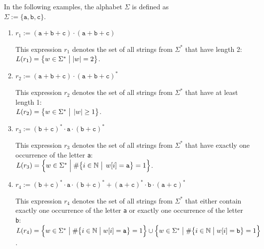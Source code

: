 \examplesEng
In the following examples, the alphabet $ \Sigma $ is defined as
\\[0.2cm]
\hspace*{1.3cm}
$\Sigma := \{ \texttt{a}, \texttt{b}, \texttt{c} \}$.
\begin{enumerate}
\item $ r_1 := (\texttt{a} + \texttt{b} + \texttt{c}) \cdot (\texttt{a} + \texttt{b} + \texttt{c}) $

      This expression $ r_1 $ denotes the set of all strings from $\Sigma^*$ that have length 2:
      \\[0.2cm]
      \hspace*{1.3cm}
      $ L(r_1) = \bigl\{ w \in \Sigma^* \bigm| |w| = 2 \bigr\}$.
\item $ r_2 := (\texttt{a} + \texttt{b} + \texttt{c}) \cdot (\texttt{a} + \texttt{b} + \texttt{c})^* $

      This expression $ r_2 $ denotes the set of all strings from $\Sigma^*$ that have at least length 1:
      \\[0.2cm]
      \hspace*{1.3cm}
      $L(r_2) = \bigl\{ w \in \Sigma^* \bigm|\, |w| \geq 1 \bigr\}$.
\item $ r_3 := (\texttt{b} + \texttt{c})^* \cdot \texttt{a} \cdot (\texttt{b} + \texttt{c})^* $

      This expression $ r_3 $ denotes the set of all strings from $\Sigma^*$ that have exactly one occurrence of the letter \texttt{a}:
      \\[0.2cm]
      \hspace*{1.3cm}
      $L(r_3) = \Bigl\{ w \in \Sigma^* \Bigm| \#\bigl\{i \in \mathbb{N} \bigm|\, w[i] = \texttt{a} \bigr\} = 1 \Bigr\}$. 
\item $ r_4 :=  (\texttt{b} + \texttt{c})^* \cdot \texttt{a} \cdot (\texttt{b} + \texttt{c})^* + (\texttt{a} + \texttt{c})^* \cdot \texttt{b} \cdot (\texttt{a} + \texttt{c})^* $

      This expression $ r_4 $ denotes the set of all strings from $\Sigma^*$ that either contain exactly one
      occurrence of the letter \texttt{a} or exactly one occurrence of the letter \texttt{b}: 
      \\[0.2cm]
      \hspace*{1.3cm}
      $L(r_4) = \Bigl\{ w \in \Sigma^* \bigm| \#\bigl\{i \in \mathbb{N} \bigm| w[i] = \texttt{a} \bigr\} = 1
      \Bigr\} \cup \Bigl\{ w \in \Sigma^* \bigm| \#\bigl\{i \in \mathbb{N} \bigm| w[i] = \texttt{b} \bigr\} = 1
      \Bigr\}$.  \eox
\end{enumerate}

